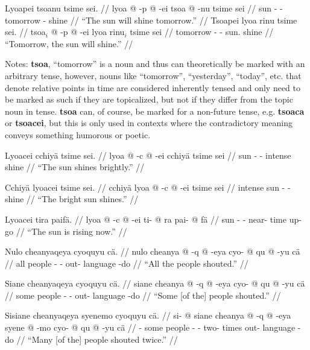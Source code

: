 \documentclass{article}
\begin{document}
\pex[lingstyle=QuCheanya] 
\a \begingl
\glpreamble Lyoapei tsoanu tsime sei. //
\gla lyoa @ -p @ -ei tsoa @ -nu tsime sei //
\glb sun - - tomorrow - shine  //
\glft ``The sun will shine tomorrow.'' //
\endgl 
\a \begingl
\glpreamble Tsoapei lyoa rinu tsime sei. //
\gla tsoa$_i$ @ -p @ -ei lyoa rinu$_i$ tsime sei //
\glb tomorrow - - sun.  shine  //
\glft ``Tomorrow, the sun will shine.'' //
\endgl
\xe

Notes: \textbf{tsoa}, ``tomorrow'' is a noun and thus can theoretically be marked with an arbitrary tense, however, nouns like ``tomorrow'', ``yesterday'', ``today'', etc. that denote relative points in time are considered inherently tensed and only need to be marked as such if they are topicalized, but not if they differ from the topic noun in tense.  \textbf{tsoa} can, of course, be marked for a non-future tense, e.g. \textbf{tsoaca} or \textbf{tsoacei}, but this is only used in contexts where the contradictory meaning conveys something humorous or poetic.

\ex[lingstyle=QuCheanya] \begingl
\glpreamble Lyoacei cchiy\"a tsime sei. //
\gla lyoa @ -c @ -ei cchiy\"a tsime sei //
\glb sun - - intense shine  //
\glft ``The sun shines brightly.'' //
\endgl \xe

\ex[lingstyle=QuCheanya] \begingl
\glpreamble Cchiy\"a lyoacei tsime sei. //
\gla cchiy\"a lyoa @ -c @ -ei tsime sei //
\glb intense sun - - shine  //
\glft ``The bright sun shines.'' //
\endgl \xe

\ex[lingstyle=QuCheanya] \begingl
\glpreamble Lyoacei tira paif\"a. //
\gla lyoa @ -c @ -ei ti- @ ra pai- @ f\"a //
\glb sun - - near- time up- go //
\glft ``The sun is rising now.'' //
\endgl \xe

\ex[lingstyle=QuCheanya] \begingl
\glpreamble Nulo cheanyaqeya cyoquyu c\"a. //
\gla nulo cheanya @ -q @ -eya cyo- @ qu @ -yu c\"a //
\glb all people - - out- language -do  //
\glft ``All the people shouted.'' //
\endgl \xe

\ex[lingstyle=QuCheanya] \begingl
\glpreamble Siane cheanyaqeya cyoquyu c\"a. //
\gla siane cheanya @ -q @ -eya cyo- @ qu @ -yu c\"a //
\glb some people - - out- language -do  //
\glft ``Some [of the] people shouted.'' //
\endgl \xe

\ex[lingstyle=QuCheanya] \begingl
\glpreamble Sisiane cheanyaqeya syenemo cyoquyu c\"a. //
\gla si- @ siane cheanya @ -q @ -eya syene @ -mo cyo- @ qu @ -yu c\"a //
\glb {}- some people - - two- times out- language -do  //
\glft ``Many [of the] people shouted twice.'' //
\endgl \xe
\end{document}
